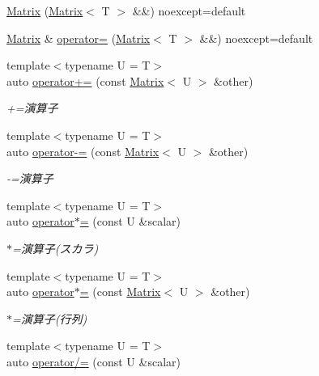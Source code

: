 \begin{DoxyCompactItemize}
\item 
\mbox{\hyperlink{classsaki_1_1_matrix_aced6f31e05917c2c41305dd0be082f8b}{Matrix}} (\mbox{\hyperlink{classsaki_1_1_matrix}{Matrix}}$<$ T $>$ \&\&) noexcept=default
\item 
\mbox{\hyperlink{classsaki_1_1_matrix}{Matrix}} \& \mbox{\hyperlink{classsaki_1_1_matrix_a96b3519d691108a606d4ece3a9bac134}{operator=}} (\mbox{\hyperlink{classsaki_1_1_matrix}{Matrix}}$<$ T $>$ \&\&) noexcept=default
\item 
{\footnotesize template$<$typename U  = T$>$ }\\auto \mbox{\hyperlink{classsaki_1_1_matrix_a06e54f0ce6ff0cd591725a753d9a4c60}{operator+=}} (const \mbox{\hyperlink{classsaki_1_1_matrix}{Matrix}}$<$ U $>$ \&other)
\begin{DoxyCompactList}\small\item\em +=演算子 \end{DoxyCompactList}\item 
{\footnotesize template$<$typename U  = T$>$ }\\auto \mbox{\hyperlink{classsaki_1_1_matrix_a782a94fb837a9973fed259c55e6817f1}{operator-\/=}} (const \mbox{\hyperlink{classsaki_1_1_matrix}{Matrix}}$<$ U $>$ \&other)
\begin{DoxyCompactList}\small\item\em -\/=演算子 \end{DoxyCompactList}\item 
{\footnotesize template$<$typename U  = T$>$ }\\auto \mbox{\hyperlink{classsaki_1_1_matrix_aae1ffee9f67e7c9893a2329c75bd8a51}{operator$\ast$=}} (const U \&scalar)
\begin{DoxyCompactList}\small\item\em $\ast$=演算子(スカラ) \end{DoxyCompactList}\item 
{\footnotesize template$<$typename U  = T$>$ }\\auto \mbox{\hyperlink{classsaki_1_1_matrix_a66c88e0fcf5b1e86180c097ff24ceff4}{operator$\ast$=}} (const \mbox{\hyperlink{classsaki_1_1_matrix}{Matrix}}$<$ U $>$ \&other)
\begin{DoxyCompactList}\small\item\em $\ast$=演算子(行列) \end{DoxyCompactList}\item 
{\footnotesize template$<$typename U  = T$>$ }\\auto \mbox{\hyperlink{classsaki_1_1_matrix_a12f386d5595d02c11a8a7af642183c6c}{operator/=}} (const U \&scalar)

\end{DoxyCompactItemize}
